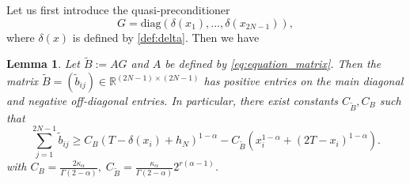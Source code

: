 \documentclass{amsart}
\newtheorem{lemma}[theorem]{Lemma}
\theoremstyle{definition}
\theoremstyle{remark}
\numberwithin{equation}{section}
\begin{document}
Let us first introduce the quasi-preconditioner
\begin{equation} \label{def:G}
  G = \text{diag}(\delta(x_1), ..., \delta(x_{2N-1})),
\end{equation}
where $\delta(x)$ is defined by \eqref{def:delta}.
Then we have
\begin{lemma} \label{lmm:AGhasSingularity}
  Let \(\tilde{B}:= AG\) and $A$ be defined by \eqref{eq:equation_matrix}. 
  Then the matrix $\tilde{B} = (\tilde{b}_{ij}) \in \mathbb{R}^{(2N-1) \times (2N-1)}$ has positive entries on the main diagonal and negative off-diagonal entries.
  In particular, there exist constants \(C_{\tilde{B}}, C_B\) such that
  \begin{equation*}
    \sum_{j=1}^{2N-1} \tilde{b}_{ij}
    \ge  C_B (T - \delta(x_{i}) + h_N)^{1-\alpha} -C_{\tilde{B}} (x_i^{1-\alpha} + (2T-x_i)^{1-\alpha}) .
  \end{equation*}
  with
  \(
    C_B = \frac{2\kappa_\alpha}{\Gamma(2-\alpha)}, \;
    C_{\tilde{B}} = \frac{\kappa_\alpha}{\Gamma(2-\alpha)} 2^{r(\alpha-1)} \). 
\end{lemma}
\end{document}
